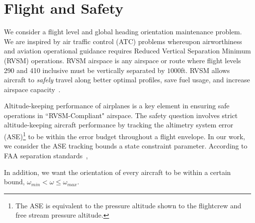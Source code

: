\section{Flight and Safety}
\label{sec:flight_safety}

We consider a flight level and global heading orientation maintenance problem. We are inspired by air traffic control (ATC) problems whereupon airworthiness and aviation operational guidance requires Reduced Vertical Separation Minimum (RVSM) operations. RVSM airspace is any airspace or route where flight levels 290 and 410 inclusive must be vertically separated by $1000$ft. RVSM allows aircraft to \textit{safely} travel along better optimal profiles, save fuel usage, and increase airspace capacity~\cite{FAARVSM}. 

Altitude-keeping performance of airplanes is a key element in ensuring safe operations in ``RVSM-Compliant" airspace. The safety question involves strict altitude-keeping aircraft performance by tracking the altimetry system error (ASE)\footnote{The ASE is equivalent to the pressure altitude shown to the flightcrew and free stream pressure altitude.} to be within the error budget throughout a flight envelope. In our work, we consider the ASE tracking bounds a state constraint parameter. According to FAA separation standards~\cite{FAASep}, 

In addition, we want the orientation of every aircraft to be within a certain bound, $\omega_{min} < \omega \le \omega_{max}$.
